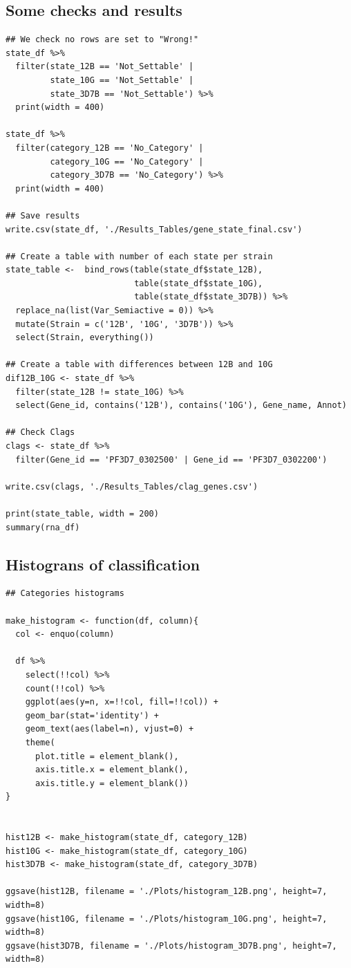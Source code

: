 \documentclass[11pt]{article}
\begin{document}
\subsection{Some checks and results}
\label{sec:orgc10d67d}
\begin{verbatim}
## We check no rows are set to "Wrong!"
state_df %>%
  filter(state_12B == 'Not_Settable' |
         state_10G == 'Not_Settable' |
         state_3D7B == 'Not_Settable') %>%
  print(width = 400)

state_df %>%
  filter(category_12B == 'No_Category' |
         category_10G == 'No_Category' |
         category_3D7B == 'No_Category') %>%
  print(width = 400)

## Save results
write.csv(state_df, './Results_Tables/gene_state_final.csv')

## Create a table with number of each state per strain
state_table <-  bind_rows(table(state_df$state_12B),
                          table(state_df$state_10G),
                          table(state_df$state_3D7B)) %>%
  replace_na(list(Var_Semiactive = 0)) %>%
  mutate(Strain = c('12B', '10G', '3D7B')) %>%
  select(Strain, everything())

## Create a table with differences between 12B and 10G
dif12B_10G <- state_df %>%
  filter(state_12B != state_10G) %>%
  select(Gene_id, contains('12B'), contains('10G'), Gene_name, Annot)

## Check Clags
clags <- state_df %>%
  filter(Gene_id == 'PF3D7_0302500' | Gene_id == 'PF3D7_0302200')

write.csv(clags, './Results_Tables/clag_genes.csv')

print(state_table, width = 200)
summary(rna_df)
\end{verbatim}
\subsection{Histograns of classification}
\label{sec:orgf4c7718}
\begin{verbatim}
## Categories histograms

make_histogram <- function(df, column){
  col <- enquo(column)

  df %>%
    select(!!col) %>%
    count(!!col) %>%
    ggplot(aes(y=n, x=!!col, fill=!!col)) +
    geom_bar(stat='identity') +
    geom_text(aes(label=n), vjust=0) +
    theme(
      plot.title = element_blank(),
      axis.title.x = element_blank(),
      axis.title.y = element_blank())
}


hist12B <- make_histogram(state_df, category_12B)
hist10G <- make_histogram(state_df, category_10G)
hist3D7B <- make_histogram(state_df, category_3D7B)

ggsave(hist12B, filename = './Plots/histogram_12B.png', height=7, width=8)
ggsave(hist10G, filename = './Plots/histogram_10G.png', height=7, width=8)
ggsave(hist3D7B, filename = './Plots/histogram_3D7B.png', height=7, width=8)
\end{verbatim}
\end{document}
